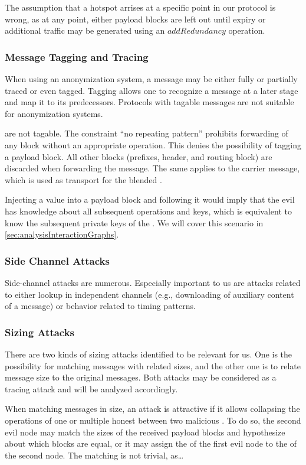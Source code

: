 The assumption that a hotspot arrises at a specific point in our protocol is wrong, as at any point, either payload blocks are left out until expiry or additional traffic may be generated using an $addRedundancy$ operation.

\subsubsection{Message Tagging and Tracing}
When using an anonymization system, a message may be either fully or partially traced or even tagged. Tagging allows one to recognize a message at a later stage and map it to its predecessors. Protocols with tagable messages are not suitable for anonymization systems.

\VortexMessages{} are not tagable. The constraint ``no repeating pattern'' prohibits forwarding of any block without an appropriate operation. This denies the possibility of tagging a payload block. All other blocks (prefixes, header, and routing block) are discarded when forwarding the message. The same applies to the carrier message, which is used as transport for the blended \VortexMessage.

Injecting a value into a payload block and following it would imply that the evil \VortexNode{} has knowledge about all subsequent operations and keys, which is equivalent to know the subsequent private keys of the \VortexNodes. We will cover this scenario in \cref{sec:analysisInteractionGraphs}.

\subsubsection{Side Channel Attacks}
Side-channel attacks are numerous. Especially important to us are attacks related to either lookup in independent channels (e.g., downloading of auxiliary content of a message) or behavior related to timing patterns.

\subsubsection{Sizing Attacks}
There are two kinds of sizing attacks identified to be relevant for us. One is the possibility for matching messages with related sizes, and the other one is to relate message size to the original messages. Both attacks may be considered as a tracing attack and will be analyzed accordingly. 

When matching messages in size, an attack is attractive if it allows collapsing the operations of one or multiple honest \VortexNodes{} between two malicious \VortexNodes. To do so, the second evil node may match the sizes of the received payload blocks and hypothesize about which blocks are equal, or it may assign the  of the first evil node to the  of the second node. The matching is not trivial, as\ldots

